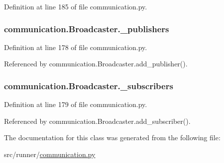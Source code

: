 Definition at line 185 of file communication.\+py.

\hypertarget{classcommunication_1_1Broadcaster_a12a6ec3d85e13744b6ed8d6467451f50}{}
\subsubsection[{\+\_\+publishers}]{\setlength{\rightskip}{0pt plus 5cm}communication.\+Broadcaster.\+\_\+publishers\hspace{0.3cm}{\ttfamily [private]}}\label{classcommunication_1_1Broadcaster_a12a6ec3d85e13744b6ed8d6467451f50}


Definition at line 178 of file communication.\+py.



Referenced by communication.\+Broadcaster.\+add\+\_\+publisher().

\hypertarget{classcommunication_1_1Broadcaster_a286ed760fbf3c09413a72a8ed32181e0}{}
\subsubsection[{\+\_\+subscribers}]{\setlength{\rightskip}{0pt plus 5cm}communication.\+Broadcaster.\+\_\+subscribers\hspace{0.3cm}{\ttfamily [private]}}\label{classcommunication_1_1Broadcaster_a286ed760fbf3c09413a72a8ed32181e0}


Definition at line 179 of file communication.\+py.



Referenced by communication.\+Broadcaster.\+add\+\_\+subscriber().



The documentation for this class was generated from the following file\+:\begin{DoxyCompactItemize}
\item 
src/runner/\hyperlink{communication_8py}{communication.\+py}\end{DoxyCompactItemize}
